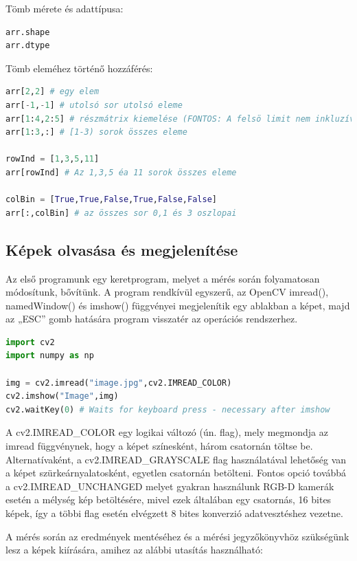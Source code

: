 \documentclass[12pt,a4paper,oneside]{report}             %
\begin{document}
Tömb mérete és adattípusa:

\begin{lstlisting}[language=Python]
arr.shape
arr.dtype
\end{lstlisting}

Tömb eleméhez történő hozzáférés:

\begin{lstlisting}[language=Python]
arr[2,2] # egy elem
arr[-1,-1] # utolsó sor utolsó eleme
arr[1:4,2:5] # részmátrix kiemelése (FONTOS: A felsö limit nem inkluzív, vagyis az [1-4) sor és a [2-5) oszlop vannak benne)
arr[1:3,:] # [1-3) sorok összes eleme 

rowInd = [1,3,5,11]
arr[rowInd] # Az 1,3,5 éa 11 sorok összes eleme

colBin = [True,True,False,True,False,False]
arr[:,colBin] # az összes sor 0,1 és 3 oszlopai
\end{lstlisting}

\subsection{Képek olvasása és megjelenítése}

Az első programunk egy keretprogram, melyet a mérés során folyamatosan módosítunk, bővítünk. A program rendkívül egyszerű, az OpenCV imread(), namedWindow() és imshow() függvényei megjelenítik egy ablakban a képet, majd az „ESC” gomb hatására program visszatér az operációs rendszerhez.

\begin{lstlisting}[language=Python]
import cv2
import numpy as np

img = cv2.imread("image.jpg",cv2.IMREAD_COLOR)
cv2.imshow("Image",img)
cv2.waitKey(0) # Waits for keyboard press - necessary after imshow
\end{lstlisting}

A cv2.IMREAD\_COLOR egy logikai változó (ún. flag), mely megmondja az imread függvénynek, hogy a képet színesként, három csatornán töltse be.  Alternatívaként, a cv2.IMREAD\_GRAYSCALE flag használatával lehetőség van a képet szürkeárnyalatosként, egyetlen csatornán betölteni. Fontos opció továbbá a cv2.IMREAD\_UNCHANGED melyet gyakran használunk RGB-D kamerák esetén a mélység kép betöltésére, mivel ezek általában egy csatornás, 16 bites képek, így a többi flag esetén elvégzett 8 bites konverzió adatvesztéshez vezetne.

A mérés során az eredmények mentéséhez és a mérési jegyzőkönyvhöz szükségünk lesz a képek kiírására, amihez az alábbi utasítás használható:
\end{document}
